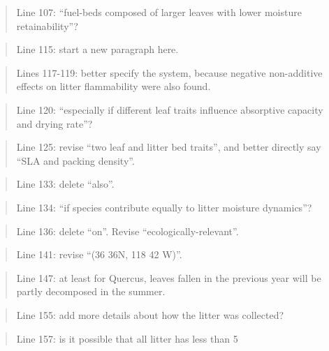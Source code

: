 \documentclass[letterpaper, 12pt]{letter}
\begin{document}
\begin{letter}{}
\begin{quote}
Line 107: “fuel-beds composed of larger leaves with lower moisture retainability”?
\end{quote}

\begin{quote}
Line 115: start a new paragraph here.
\end{quote}

\begin{quote}
Lines 117-119: better specify the system, because negative non-additive effects on litter
flammability were also found.
\end{quote}

\begin{quote}
Line 120: “especially if different leaf traits influence absorptive capacity and drying rate”?
\end{quote}

\begin{quote}
Line 125: revise “two leaf and litter bed traits”, and better directly say “SLA and packing density”.
\end{quote}

\begin{quote}
Line 133: delete “also”.
\end{quote}

\begin{quote}
Line 134: “if species contribute equally to litter moisture dynamics”?
\end{quote}

\begin{quote}
Line 136: delete “on”. Revise “ecologically-relevant”.
\end{quote}

\begin{quote}
Line 141: revise “(36 36N, 118 42 W)”.
\end{quote}

\begin{quote}
Line 147: at least for Quercus, leaves fallen in the previous year will be partly decomposed in the summer.
\end{quote}

\begin{quote}
Line 155: add more details about how the litter was collected?
\end{quote}

\begin{quote}
Line 157: is it possible that all litter has less than 5%
\end{quote}


\end{letter}
\end{document}
